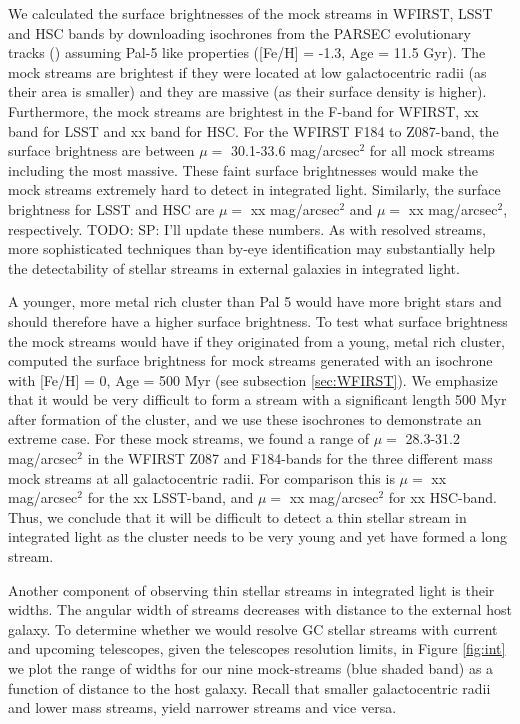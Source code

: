 \documentclass[twocolumn]{aastex62}
\newcommand{\todo}[1]{{\color{red} TODO: #1}}
\begin{document}
We calculated the surface brightnesses of the mock streams in WFIRST, LSST and HSC bands by downloading isochrones from the PARSEC evolutionary tracks (\citealt{bressan12}) assuming Pal-5 like properties ([Fe/H] = -1.3, Age = 11.5 Gyr). The mock streams are brightest if they were located at low galactocentric radii (as their area is smaller) and they are massive (as their surface density is higher). Furthermore, the mock streams are brightest in the F-band for WFIRST, xx band for LSST and xx band for HSC. 
For the WFIRST F184 to Z087-band, the surface brightness are between $\mu =$ 30.1-33.6 mag/arcsec$^2$ for all mock streams including the most massive. These faint surface brightnesses would make the mock streams extremely hard to detect in integrated light. Similarly, the surface brightness for LSST and HSC are $\mu =$ xx mag/arcsec$^2$  and $\mu =$ xx mag/arcsec$^2$, respectively. \todo{SP: I'll update these numbers.} As with resolved streams, more sophisticated techniques than by-eye identification may substantially help the detectability of stellar streams in external galaxies in integrated light.

A younger, more metal rich cluster than Pal 5 would have more bright stars and should therefore have a higher surface brightness. To test what surface brightness the mock streams would have if they originated from a young, metal rich cluster, computed the surface brightness for mock streams generated with an isochrone with [Fe/H] =  0, Age = 500 Myr (see subsection \ref{sec:WFIRST}). We emphasize that it would be very difficult to form a stream with a significant length 500 Myr after formation of the cluster, and we use these isochrones to demonstrate an extreme case. For these mock streams, we found a range of $\mu =$ 28.3-31.2 mag/arcsec$^2$ in the WFIRST Z087 and F184-bands for the three different mass mock streams at all galactocentric radii. For comparison this is $\mu =$ xx mag/arcsec$^2$ for the xx LSST-band, and $\mu =$ xx mag/arcsec$^2$ for xx HSC-band.
Thus, we conclude that it will be difficult to detect a thin stellar stream in integrated light as the cluster needs to be very young and yet have formed a long stream.

Another component of observing thin stellar streams in integrated light is their widths. The angular width of streams decreases with distance to the external host galaxy. To determine whether we would resolve GC stellar streams with current and upcoming telescopes, given the telescopes resolution limits, in Figure \ref{fig:int} we plot the range of widths for our nine mock-streams (blue shaded band) as a function of distance to the host galaxy. Recall that smaller galactocentric radii and lower mass streams, yield narrower streams and vice versa. %
\end{document}

